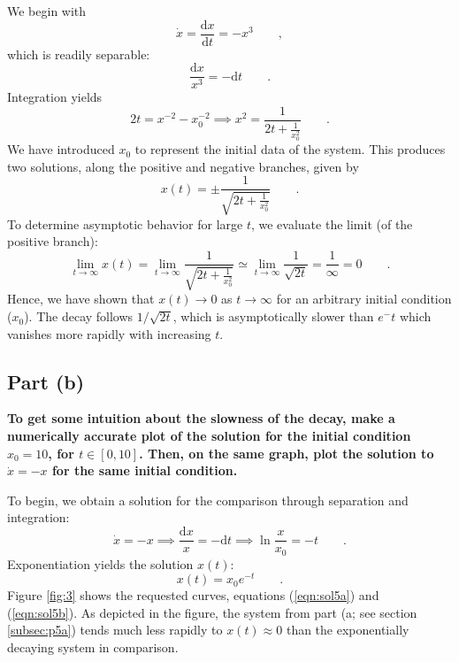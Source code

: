 \documentclass[draft]{agujournal2019}
\begin{document}
We begin with
\begin{equation*}
    \dot x = \frac{\mathrm{d}x}{\mathrm{d}t} = -x^3 \qquad ,
\end{equation*}
which is readily separable:
\begin{equation*}
    \frac{\mathrm{d}x}{x^3} = - \mathrm{d}t \qquad .
\end{equation*}
Integration yields 
\begin{equation*}
    2 t = x^{-2} - x_0^{-2} \implies x^2 = \frac{1}{2t + \frac{1}{x_0^2}} \qquad .
\end{equation*}
We have introduced $x_0$ to represent the initial data of the system. This produces two solutions, along the positive and negative branches, given by
\begin{equation}
\label{eqn:sol5a}
    x(t) = \pm \frac{1}{\sqrt{2t + \frac{1}{x_0^2}}} \qquad .
\end{equation}
To determine asymptotic behavior for large $t$, we evaluate the limit (of the positive branch):
\begin{equation*}
    \lim_{t\longrightarrow\infty} x(t) = \lim_{t\longrightarrow\infty} \frac{1}{\sqrt{2t + \frac{1}{x_0^2}}} \simeq \lim_{t\longrightarrow\infty} \frac{1}{\sqrt{2t}} = \frac{1}{\infty} = 0 \qquad .
\end{equation*}
Hence, we have shown that $x(t)\longrightarrow 0$ as $t\longrightarrow\infty$ for an arbitrary initial condition ($x_0$). The decay follows $1/\sqrt{2t}$, which is asymptotically slower than $e^-t$ which vanishes more rapidly with increasing $t$. 


\subsection{Part (b)}
\label{subsec:p5b}
\textbf{To get some intuition about the slowness of the decay, make a numerically accurate plot of the solution for the initial condition $x_0=10$, for $t\in[0,10]$. Then, on the same graph, plot the solution to $\dot x = -x$ for the same initial condition. }
\par
To begin, we obtain a solution for the comparison through separation and integration:
\begin{equation*}
    \dot x = -x \implies \frac{\mathrm{d}x}{x} = -\mathrm{d}t \implies \ln{\frac{x}{x_0}} = -t \qquad .
\end{equation*}
Exponentiation yields the solution $x(t)$:
\begin{equation}
\label{eqn:sol5b}
    x(t) = x_0 e^{-t} \qquad .
\end{equation}
Figure \ref{fig:3} shows the requested curves, equations (\ref{eqn:sol5a}) and (\ref{eqn:sol5b}).
As depicted in the figure, the system from part (a; see section \ref{subsec:p5a}) tends much less rapidly to $x(t)\approx0$ than the exponentially decaying system in comparison.
\end{document}
